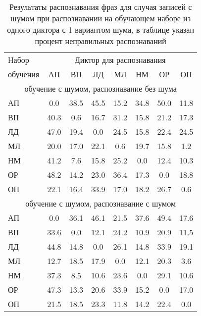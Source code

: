 \begin{table}[h]
	\centering
	\caption{Результаты распознавания фраз для случая записей с шумом при распознавании на обучающем наборе из одного диктора с 1 вариантом шума, в таблице указан процент неправильных распознаваний}
	\label{tab:cnn_phrases_1dictor_1noise}
	\begin{tabular}{| l | c | c | c | c | c | c | c |}
		\hline
		Набор & \multicolumn{7}{c|}{Диктор для распознавания} \\
		\hhline{~-------}
		обучения \phantom{0000} & \phantom{0} АП \phantom{0} & \phantom{0} ВП \phantom{0} & \phantom{0} ЛД \phantom{0} & \phantom{0} МЛ \phantom{0} & \phantom{0} НМ \phantom{0} & \phantom{0} ОР \phantom{0} & \phantom{0} ОП \phantom{0} \\
		\hline
		\multicolumn{8}{|c|}{обучение с шумом, распознавание без шума} \\
		\hline
		АП		 &  0.0 & 38.5 & 45.5 & 15.2 & 34.8 & 50.0 & 11.8 \\
		ВП		 & 40.3 &  0.6 & 16.7 & 31.2 & 15.8 & 21.2 & 17.3 \\
		ЛД		 & 47.0 & 19.4 &  0.0 & 24.5 & 15.8 & 22.4 & 24.5 \\
		МЛ		 & 20.0 & 17.0 & 22.1 &  0.6 & 19.7 & 15.8 &  1.2 \\
		НМ		 & 41.2 &  7.6 & 15.8 & 25.2 &  0.0 & 12.4 & 10.3 \\
		ОР		 & 48.2 & 14.2 & 23.0 & 36.4 & 17.3 &  0.0 & 18.8 \\
		ОП		 & 22.1 & 16.4 & 33.9 & 17.0 & 18.2 & 26.7 &  0.6 \\
		\hline
		\multicolumn{8}{|c|}{обучение с шумом, распознавание с шумом} \\
		\hline
		АП		 &  0.0 & 36.1 & 46.1 & 21.5 & 37.6 & 49.4 & 17.6 \\
		ВП		 & 33.6 &  0.0 & 12.1 & 24.2 & 10.9 & 20.9 & 11.5 \\
		ЛД		 & 44.8 & 14.8 &  0.0 & 26.1 & 14.8 & 33.9 & 19.1 \\
		МЛ		 & 12.7 & 18.5 & 17.9 &  0.0 & 12.1 & 20.3 &  3.6 \\
		НМ		 & 37.3 &  8.5 & 10.6 & 23.6 &  0.0 & 29.1 & 10.6 \\
		ОР		 & 47.3 & 13.3 & 20.6 & 33.9 & 15.2 &  0.0 & 17.0 \\
		ОП		 & 21.5 & 18.5 & 23.3 & 11.8 & 14.2 & 22.4 &  0.0 \\
		\hline
	\end{tabular}
\end{table}


